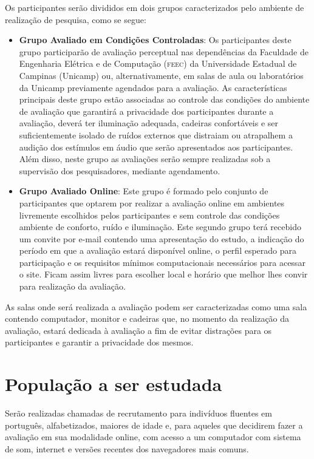 \documentclass[a4paper,11pt,titlepage,singlespacing]{article}
\begin{document}
\noindent Os participantes serão divididos em dois grupos caracterizados pelo ambiente de realização de pesquisa, como se segue:

\begin{itemize}
    \item \textbf{Grupo Avaliado em Condições Controladas}: Os participantes deste grupo participarão de avaliação perceptual nas dependências da Faculdade de Engenharia Elétrica e de Computação (\textsc{feec}) da Universidade Estadual de Campinas (Unicamp) ou, alternativamente, em salas de aula ou laboratórios da Unicamp previamente agendados para a avaliação. As características principais deste grupo estão associadas ao controle das condições do ambiente de avaliação que garantirá a privacidade dos participantes durante a avaliação, deverá ter iluminação adequada, cadeiras confortáveis e ser suficientemente isolado de ruídos externos que distraiam ou atrapalhem a audição dos estímulos em áudio que serão apresentados aos participantes. Além disso, neste grupo as avaliações serão sempre realizadas sob a supervisão dos pesquisadores, mediante agendamento. 
    \item \textbf{Grupo Avaliado Online}: Este grupo é formado pelo conjunto de participantes que optarem por realizar a avaliação online em ambientes livremente escolhidos pelos participantes e sem controle das condições ambiente de conforto, ruído e iluminação. Este segundo grupo terá recebido um convite por e-mail contendo uma apresentação do estudo, a indicação do período em que a avaliação estará disponível online, o perfil esperado para participação e os requisitos mínimos computacionais necessários para acessar o site. Ficam assim livres para escolher local e horário que melhor lhes convir para realização da avaliação.
\end{itemize}

\noindent As salas onde será realizada a avaliação podem ser caracterizadas como uma sala contendo computador, monitor e cadeiras que, no momento da realização da avaliação, estará dedicada à avaliação a fim de evitar distrações para os participantes e garantir a privacidade dos mesmos.

\section{População a ser estudada}

\noindent Serão realizadas chamadas de recrutamento para indivíduos fluentes em português, alfabetizados, maiores de idade e, para aqueles que decidirem fazer a avaliação em sua modalidade online, com acesso a um computador com sistema de som, internet e versões recentes dos navegadores mais comuns.
\end{document}
